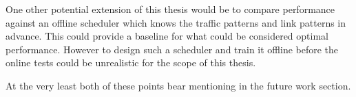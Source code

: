 One other potential extension of this thesis would be to compare performance against an offline scheduler which knows the traffic patterns and link patterns in advance. This could provide a baseline for what could be considered optimal performance. However to design such a scheduler and train it offline before the online tests could be unrealistic for the scope of this thesis.

At the very least both of these points bear mentioning in the future work section.